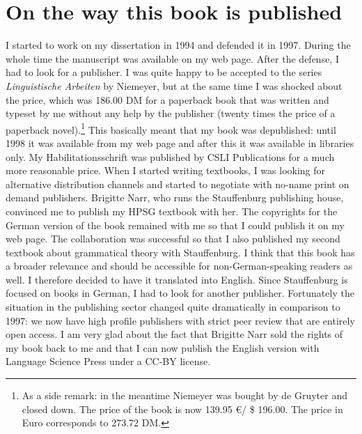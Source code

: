 \section*{On the way this book is published}

\addlines
I started to work on my dissertation in 1994 and defended it in 1997. During the whole time the
manuscript was available on my web page. After the defense, I had to look for a publisher. I was
quite happy to be accepted to the series \emph{Linguistische Arbeiten} by Niemeyer, but at the same time I
was shocked about the price, which was 186.00 DM for a paperback book that was written and typeset
by me without any help by the publisher (twenty times the price of a paperback novel).\footnote{
  As a side remark: in the meantime Niemeyer was bought by de Gruyter and closed down. The price of the book is now
  139.95 \euro / \$ 196.00. The price in Euro corresponds to 273.72 DM. 
} This
basically meant that my book was depublished: until 1998 it was available from my web page and after
this it was available in libraries only. My Habilitationsschrift was published by CSLI Publications
for a much more reasonable price. When I started writing textbooks, I was looking for alternative
distribution channels and started to negotiate with no-name print on demand publishers. Brigitte Narr,
who runs the Stauffenburg publishing house, convinced me to publish my HPSG textbook with her. The
copyrights for the German version of the book remained with me so that I could publish it on my web page. The collaboration was successful so that I also published my second textbook about
grammatical theory with Stauffenburg. I think that this book has a broader relevance and should be
accessible for non-German-speaking readers as well. I therefore decided to have it translated into
English. Since Stauffenburg is focused on books in German, I had to look for another publisher. Fortunately the situation in the publishing sector changed quite dramatically in comparison
to 1997: we now have high profile publishers with strict peer review that are entirely open access. I am very
glad about the fact that Brigitte Narr sold the rights of my book back to me and that I can now 
publish the English version with Language Science Press under a CC-BY license.

